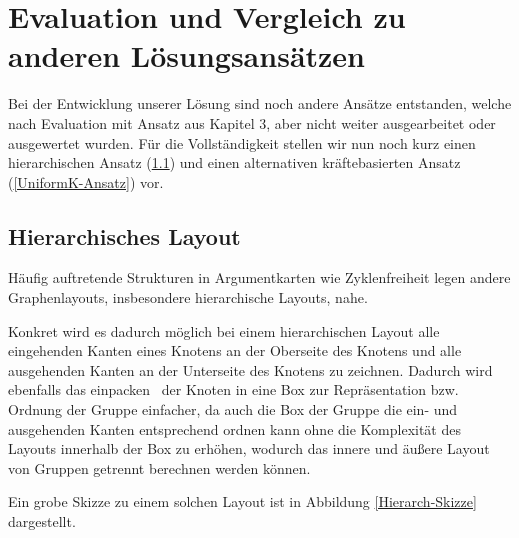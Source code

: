 \chapter{Evaluation und Vergleich zu anderen Lösungsansätzen}
\label{chapter:vgl} 
Bei der Entwicklung unserer Lösung sind noch andere Ansätze entstanden, welche nach Evaluation mit Ansatz aus Kapitel 3, aber nicht weiter ausgearbeitet oder ausgewertet wurden. Für die Vollständigkeit stellen wir nun noch kurz einen hierarchischen Ansatz (\ref{Hierarch-Ansatz}) und einen alternativen kräftebasierten Ansatz (\ref{UniformK-Ansatz}) vor.
\section{Hierarchisches Layout}
\label{Hierarch-Ansatz}
Häufig auftretende Strukturen in Argumentkarten wie Zyklenfreiheit legen andere Graphenlayouts, insbesondere hierarchische Layouts, nahe.

Konkret wird es dadurch möglich bei einem hierarchischen Layout alle eingehenden Kanten eines Knotens an der Oberseite des Knotens und alle ausgehenden Kanten an der Unterseite des Knotens zu zeichnen. Dadurch wird ebenfalls das \glqq einpacken \grqq\ der Knoten in eine Box zur Repräsentation bzw. Ordnung der Gruppe einfacher, da auch die Box der Gruppe die ein- und ausgehenden Kanten entsprechend ordnen kann ohne die Komplexität des Layouts innerhalb der Box zu erhöhen, wodurch das innere und äußere Layout von Gruppen getrennt berechnen werden können. 

Ein grobe Skizze zu einem solchen Layout ist in Abbildung \ref{Hierarch-Skizze} dargestellt.

